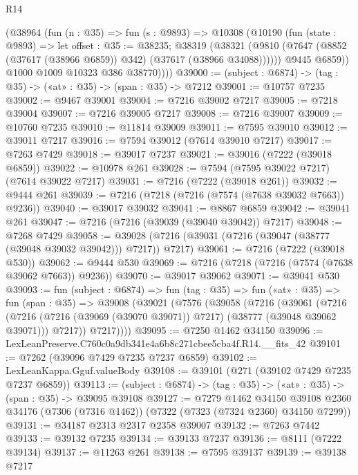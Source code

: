 \begin{lexlean}{R14}
\begin{coremodule}
          (@38964
            (fun (n : @35) =>
            fun (s : @9893) =>
            @10308
              (@10190
                (fun (state : @9893) =>
                let offset : @35 := @38235;
                @38319
                  (@38321
                    (@9810 (@7647 (@8852 (@37617 (@38966 @6859)) @342) (@37617 (@38966 @34088))))))
                @9445
                @6859))
            @1000
            @1009
            @10323
            @386
            @38770))))
@39000 := (subject : @6874) -> (tag : @35) -> («at» : @35) -> (span : @35) -> @7212
@39001 := @10757 @7235
@39002 := @9467 @39001
@39004 := @7216 @39002 @7217
@39005 := @7218 @39004
@39007 := @7216 @39005 @7217
@39008 := @7216 @39007
@39009 := @10760 @7235
@39010 := @11814 @39009
@39011 := @7595 @39010
@39012 := @39011 @7217
@39016 := @7594 @39012 (@7614 @39010 @7217)
@39017 := @7263 @7429
@39018 := @39017 @7237
@39021 := @39016 (@7222 (@39018 @6859))
@39022 := @10978 @261
@39028 := @7594 (@7595 @39022 @7217) (@7614 @39022 @7217)
@39031 := @7216 (@7222 (@39018 @261))
@39032 := @9444 @261
@39039 := @7216 (@7218 (@7216 (@7574 (@7638 @39032 @7663)) @9236))
@39040 := @39017 @39032
@39041 := @8867 @6859
@39042 := @39041 @261
@39047 := @7216 (@7216 (@39039 (@39040 @39042)) @7217)
@39048 := @7268 @7429
@39058 := @39028 (@7216 (@39031 (@7216 (@39047 (@38777 (@39048 @39032 @39042))) @7217)) @7217)
@39061 := @7216 (@7222 (@39018 @530))
@39062 := @9444 @530
@39069 := @7216 (@7218 (@7216 (@7574 (@7638 @39062 @7663)) @9236))
@39070 := @39017 @39062
@39071 := @39041 @530
@39093 := fun (subject : @6874) =>
  fun (tag : @35) =>
  fun («at» : @35) =>
  fun (span : @35) =>
  @39008
    (@39021
      (@7576
        (@39058
          (@7216
            (@39061
              (@7216
                (@7216 (@7216 (@39069 (@39070 @39071)) @7217) (@38777 (@39048 @39062 @39071)))
                @7217))
            @7217))))
@39095 := @7250 @1462 @34150
@39096 := LexLeanPreserve.C760c0a9db341e4a6b8c271cbee5cba4f.R14.__fits_42
@39101 := @7262 (@39096 @7429 @7235 @7237 @6859)
@39102 := LexLeanKappa.Gguf.valueBody
@39108 := @39101 (@271 (@39102 @7429 @7235 @7237 @6859))
@39113 := (subject : @6874) -> (tag : @35) -> («at» : @35) -> (span : @35) -> @39095 @39108
@39127 := @7279
    @1462
    @34150
    @39108
    @2360
    @34176
    (@7306 (@7316 @1462))
    (@7322 (@7323 (@7324 @2360) @34150 @7299))
@39131 := @34187 @2313 @2317 @2358 @39007
@39132 := @7263 @7442
@39133 := @39132 @7235
@39134 := @39133 @7237
@39136 := @8111 (@7222 @39134)
@39137 := @11263 @261
@39138 := @7595 @39137
@39139 := @39138 @7217

\end{coremodule}
\end{lexlean}
